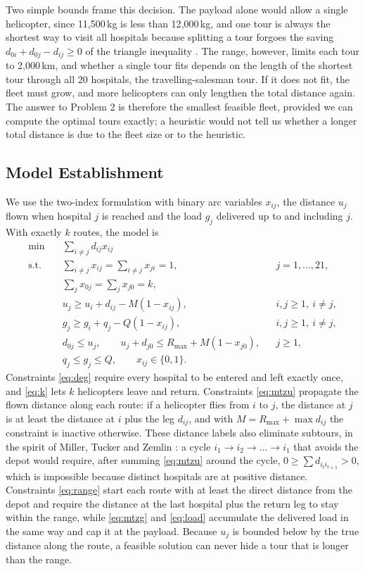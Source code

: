 \documentclass[11pt,a4paper]{article}
\theoremstyle{definition}
\begin{document}
Two simple bounds frame this decision.
The payload alone would allow a single helicopter, since 11{,}500\,kg is less than 12{,}000\,kg, and one tour is always the shortest way to visit all hospitals because splitting a tour forgoes the saving $d_{0i}+d_{0j}-d_{ij}\ge0$ of the triangle inequality \citep{clarke1964}.
The range, however, limits each tour to 2{,}000\,km, and whether a single tour fits depends on the length of the shortest tour through all 20 hospitals, the travelling-salesman tour.
If it does not fit, the fleet must grow, and more helicopters can only lengthen the total distance again.
The answer to Problem 2 is therefore the smallest feasible fleet, provided we can compute the optimal tours exactly; a heuristic would not tell us whether a longer total distance is due to the fleet size or to the heuristic.

\subsection{Model Establishment}
We use the two-index formulation with binary arc variables $x_{ij}$, the distance $u_j$ flown when hospital $j$ is reached and the load $g_j$ delivered up to and including $j$.
With exactly $k$ routes, the model is
\begin{align}
\min\quad & \sum_{i\neq j} d_{ij}x_{ij} \label{eq:vrp}\\
\text{s.t.}\quad & \sum_{i\neq j} x_{ij} = \sum_{i\neq j} x_{ji} = 1, && j=1,\dots,21, \label{eq:deg}\\
& \sum_{j} x_{0j} = \sum_{j} x_{j0} = k, \label{eq:k}\\
& u_j \ge u_i + d_{ij} - M(1-x_{ij}), && i,j\ge1,\ i\ne j, \label{eq:mtzu}\\
& g_j \ge g_i + q_j - Q(1-x_{ij}), && i,j\ge1,\ i\ne j, \label{eq:mtzg}\\
& d_{0j} \le u_j,\qquad u_j + d_{j0} \le R_{\max} + M(1-x_{j0}), && j\ge1, \label{eq:range}\\
& q_j \le g_j \le Q,\qquad x_{ij}\in\{0,1\}. \label{eq:load}
\end{align}
Constraints \eqref{eq:deg} require every hospital to be entered and left exactly once, and \eqref{eq:k} lets $k$ helicopters leave and return.
Constraints \eqref{eq:mtzu} propagate the flown distance along each route: if a helicopter flies from $i$ to $j$, the distance at $j$ is at least the distance at $i$ plus the leg $d_{ij}$, and with $M=R_{\max}+\max d_{ij}$ the constraint is inactive otherwise.
These distance labels also eliminate subtours, in the spirit of Miller, Tucker and Zemlin \citep{miller1960,kara2004}: a cycle $i_1\to i_2\to\dots\to i_1$ that avoids the depot would require, after summing \eqref{eq:mtzu} around the cycle, $0\ge\sum d_{i_ti_{t+1}}>0$, which is impossible because distinct hospitals are at positive distance.
Constraints \eqref{eq:range} start each route with at least the direct distance from the depot and require the distance at the last hospital plus the return leg to stay within the range, while \eqref{eq:mtzg} and \eqref{eq:load} accumulate the delivered load in the same way and cap it at the payload.
Because $u_j$ is bounded below by the true distance along the route, a feasible solution can never hide a tour that is longer than the range.
\end{document}
